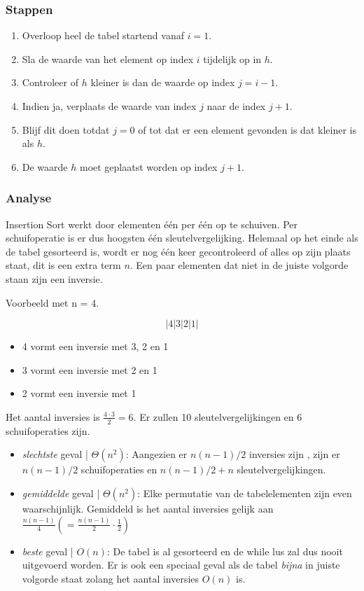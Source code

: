 \documentclass{report}
\begin{document}
\subsubsection{Stappen}
\begin{enumerate}
 \item Overloop heel de tabel startend vanaf $i = 1$.
 \item Sla de waarde van het element op index $i$ tijdelijk op in $h$.
 \item Controleer of $h$ kleiner is dan de waarde op index $j = i - 1$.
 \item Indien ja, verplaats de waarde van index $j$ naar de index $j + 1$.
 \item Blijf dit doen totdat $j = 0$ of tot dat er een element gevonden is dat kleiner is als $h$.
 \item De waarde $h$ moet geplaatst worden op index $j + 1$.
\end{enumerate}
\subsubsection{Analyse}
Insertion Sort werkt door elementen één per één op te schuiven. Per schuifoperatie is er dus hoogsten één sleutelvergelijking. Helemaal op het einde als de tabel gesorteerd is, wordt er nog één keer gecontroleerd of alles op zijn plaats staat, dit is een extra term $n$. Een paar elementen dat niet in de juiste volgorde staan zijn een inversie.

 Voorbeeld met n = 4.
 
    $$|4|3|2|1|$$
    \begin{itemize}
        \item 4 vormt een inversie met 3, 2 en 1
        \item 3 vormt een inversie met 2 en 1
        \item 2 vormt een inversie met 1
    \end{itemize}
    Het aantal inversies is $\frac{4\cdot3}{2} = 6$. Er zullen 10 sleutelvergelijkingen en 6 schuifoperaties zijn. 

\begin{itemize}
 \item \textit{slechtste} geval | $\Theta(n^2)$: Aangezien er $n(n - 1)/2$ inversies zijn , zijn er $n(n - 1)/2$ schuifoperaties en $n(n - 1)/2 + n$ sleutelvergelijkingen.
 

 \item \textit{gemiddelde} geval | $\Theta(n^2)$: Elke permutatie van de tabelelementen zijn even waarschijnlijk. Gemiddeld is het aantal inversies gelijk aan $\frac{n(n - 1)}{4} (= \frac{n(n - 1)}{2}\cdot \frac{1}{2})$
 \item \textit{beste} geval | $O(n)$: De tabel is al gesorteerd en de while lus zal dus nooit uitgevoerd worden. Er is ook een speciaal geval als de tabel \textit{bijna} in juiste volgorde staat zolang het aantal inversies $O(n)$ is.
\end{itemize}
\end{document}
